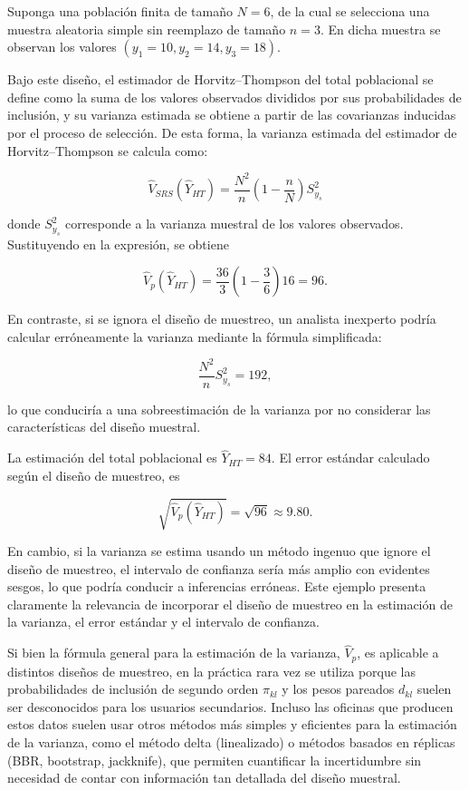 \documentclass[
  spanish,
  12pt,
]{book}
\begin{document}
Suponga una población finita de tamaño \(N=6\), de la cual se selecciona una muestra aleatoria simple sin reemplazo de tamaño \(n=3\). En dicha muestra se observan los valores \((y_1=10, y_2=14, y_3=18)\).

Bajo este diseño, el estimador de Horvitz--Thompson del total poblacional se define como la suma de los valores observados divididos por sus probabilidades de inclusión, y su varianza estimada se obtiene a partir de las covarianzas inducidas por el proceso de selección. De esta forma, la varianza estimada del estimador de Horvitz--Thompson se calcula como:

\begin{equation}
\hat{V}_{SRS}(\hat{Y}_{HT}) = \frac{N^2}{n}\left(1-\frac{n}{N}\right)S_{y_s}^2 
\label{eq:var-srs}
\end{equation}

donde \(S_{y_s}^2\) corresponde a la varianza muestral de los valores observados. Sustituyendo en la expresión, se obtiene

\[
\hat{V}_p(\hat{Y}_{HT}) = \frac{36}{3}\left(1-\frac{3}{6}\right)16 = 96.
\]

En contraste, si se ignora el diseño de muestreo, un analista inexperto podría calcular erróneamente la varianza mediante la fórmula simplificada:

\[
\frac{N^2}{n}S_{y_s}^2 = 192,
\]

lo que conduciría a una sobreestimación de la varianza por no considerar las características del diseño muestral.

La estimación del total poblacional es \(\hat{Y}_{HT}=84\). El error estándar calculado según el diseño de muestreo, es

\[
\sqrt{\hat{V}_p(\hat{Y}_{HT})} = \sqrt{96} \approx 9.80.
\]

En cambio, si la varianza se estima usando un método ingenuo que ignore el diseño de muestreo, el intervalo de confianza sería más amplio con evidentes sesgos, lo que podría conducir a inferencias erróneas. Este ejemplo presenta claramente la relevancia de incorporar el diseño de muestreo en la estimación de la varianza, el error estándar y el intervalo de confianza.

Si bien la fórmula general para la estimación de la varianza, \(\hat{V}_p\), es aplicable a distintos diseños de muestreo, en la práctica rara vez se utiliza porque las probabilidades de inclusión de segundo orden \(\pi_{kl}\) y los pesos pareados \(d_{kl}\) suelen ser desconocidos para los usuarios secundarios. Incluso las oficinas que producen estos datos suelen usar otros métodos más simples y eficientes para la estimación de la varianza, como el método delta (linealizado) o métodos basados en réplicas (BBR, bootstrap, jackknife), que permiten cuantificar la incertidumbre sin necesidad de contar con información tan detallada del diseño muestral.
\end{document}
